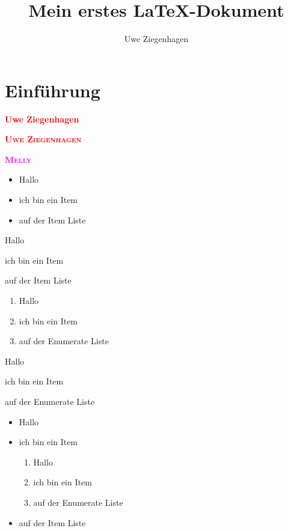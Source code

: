 \documentclass[ngerman,12pt,parskip=half]{scrreprt}
\author{Uwe Ziegenhagen}
\title{Mein erstes \LaTeX-Dokument}
\newcommand{\person}[1]{\textcolor{red}{\textsc{\textbf{#1}}}}
\newcommand{\tier}[1]{\textcolor{magenta}{\textsc{\textbf{#1}}}}
\begin{document}
 
\maketitle

\tableofcontents

\chapter{Einführung}

\textcolor{red}{\textbf{Uwe Ziegenhagen}}

\person{Uwe Ziegenhagen}

\tier{Melly}

\begin{itemize}[\(\Rightarrow\)]
\item Hallo
\item ich bin ein Item
\item auf der Item Liste
\end{itemize}

\begin{compactitem}[\(\Rightarrow\)]
\item Hallo
\item ich bin ein Item
\item auf der Item Liste
\end{compactitem}


\begin{enumerate}[i]
\item Hallo
\item ich bin ein Item
\item auf der Enumerate Liste
\end{enumerate}

\begin{compactenum}[i]
\item Hallo
\item ich bin ein Item
\item auf der Enumerate Liste
\end{compactenum}


\begin{itemize}
\item Hallo
\item ich bin ein Item
\begin{enumerate}
\item Hallo
\item ich bin ein Item
\item auf der Enumerate Liste
\end{enumerate}

\item auf der Item Liste
\end{itemize}
\end{document}
